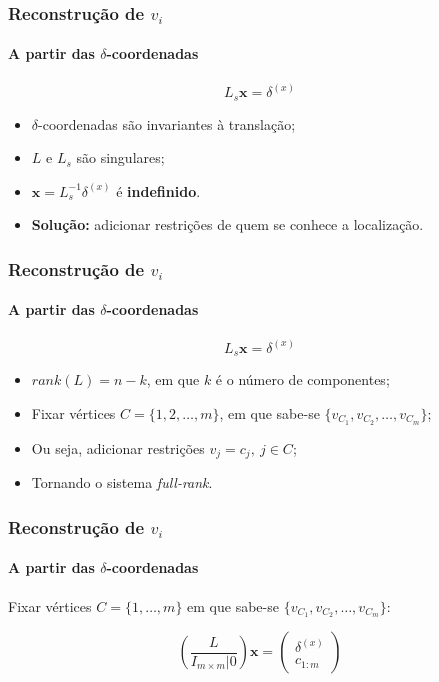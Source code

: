 \begin{frame}
\frametitle{Reconstrução de $v_i$}
\framesubtitle{A partir das $\delta$-coordenadas}

$$L_s \textbf{x} = \delta^{(x)}$$

\begin{itemize}
\item $\delta$-coordenadas são invariantes à translação;
\item $L$ e $L_s$ são singulares;
\item $\textbf{x} = L_s^{-1} \delta^{(x)}$ é \textbf{indefinido}.
\item \textbf{Solução:} adicionar restrições de quem se conhece a localização.

\end{itemize}

\end{frame}


\begin{frame}
\frametitle{Reconstrução de $v_i$}
\framesubtitle{A partir das $\delta$-coordenadas}

$$L_s \textbf{x} = \delta^{(x)}$$

\begin{itemize}
\item $rank(L) = n - k$, em que $k$ é o número de componentes;
\item Fixar vértices $C = \{1, 2, \dots, m\}$, em que sabe-se $\{v_{C_1}, v_{C_2}, \dots, v_{C_m}\}$;
\item Ou seja, adicionar restrições $v_{j} = c_j,\ j \in C$;
\item Tornando o sistema \textit{full-rank}.
\end{itemize}
	
\end{frame}


\begin{frame}
\frametitle{Reconstrução de $v_i$}
\framesubtitle{A partir das $\delta$-coordenadas}

Fixar vértices $C = \{1, \dots, m\}$ em que sabe-se $\{v_{C_1}, v_{C_2}, \dots, v_{C_m}\}$:

\bigskip

$$\left(\frac{L}{I_{m\times m} | 0}\right) \textbf{x} = \begin{pmatrix}
\delta^{(x)} \\
c_{1:m}
\end{pmatrix}$$

\bigskip
\medskip
\smallskip

\end{frame}


